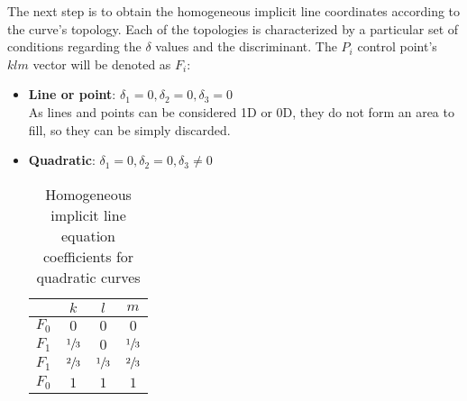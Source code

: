 \documentclass[\topdir/main.tex]{subfiles}
\begin{document}
The next step is to obtain the homogeneous implicit line coordinates according to the curve's topology. Each of the topologies is characterized by a particular set of conditions regarding the $\delta$ values and the discriminant. The $P_i$ control point's $klm$ vector will be denoted as $F_i$:

\begin{itemize}
    \item \textbf{Line or point}: $\delta_1 = 0, \delta_2 = 0, \delta_3 = 0$\\
        As lines and points can be considered 1D or 0D, they do not form an area to fill, so they can be simply discarded. 
    
    \item \textbf{Quadratic}: $\delta_1 = 0, \delta_2 = 0, \delta_3 \neq 0$\\
        \begin{table}[H]
            \centering
            \begin{tabular}{|l|c|c|c|}
                \hline
                \qquad&     $k$ &               $l$ &               $m$             \\\hline
                $F_0$ &     $0$ &               $0$ &               $0$             \\\hline
                $F_1$ &     $\sfrac{1}{3}$ &    $0$ &               $\sfrac{1}{3}$  \\\hline
                $F_1$ &     $\sfrac{2}{3}$ &    $\sfrac{1}{3}$ &    $\sfrac{2}{3}$  \\\hline
                $F_0$ &     $1$ &               $1$ &               $1$             \\\hline
            \end{tabular}
            \caption{Homogeneous implicit line equation coefficients for quadratic curves}
            \label{tab:blinnloop_klm_quadratic}
        \end{table}
    

\end{itemize}
\end{document}
